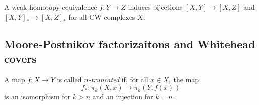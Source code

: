 \begin{proposition}[]
    A weak homotopy equivalence 
    $f \colon Y \to Z$ induces bijections
    $\left[ X,Y \right] \to 
    \left[ X,Z \right] $ and
    $\left[ X,Y \right]_* \to 
    \left[ X,Z \right]_*$ for all CW complexes
    $X$.
\end{proposition}


\subsection{Moore-Postnikov factorizaitons and Whitehead covers}

\begin{definition}[]
    A map $f \colon X \to Y$ is called
    \textit{$n$-truncated} if, for all $x \in X$, the map
    \[
    f_* \colon \pi_k (X,x) \to \pi_k(Y,f(x))
    \] 
    is an isomorphism for $k>n$ and an injection for
    $k=n$.
\end{definition}

